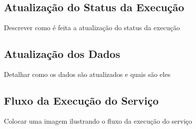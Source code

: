 \subsection{Atualização do Status da Execução}
Descrever como é feita a atualização do status da execução
\subsection{Atualização dos Dados}
Detalhar como os dados são atualizados e quais são eles
\subsection{Fluxo da Execução do Serviço}
Colocar uma imagem ilustrando o fluxo da execução do serviço
